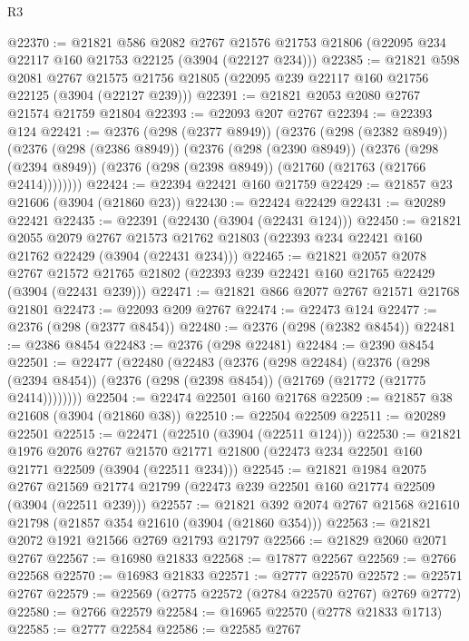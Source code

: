 \begin{lexlean}{R3}
\begin{coremodule}
@22370 := @21821
    @586
    @2082
    @2767
    @21576
    @21753
    @21806
    (@22095 @234 @22117 @160 @21753 @22125 (@3904 (@22127 @234)))
@22385 := @21821
    @598
    @2081
    @2767
    @21575
    @21756
    @21805
    (@22095 @239 @22117 @160 @21756 @22125 (@3904 (@22127 @239)))
@22391 := @21821 @2053 @2080 @2767 @21574 @21759 @21804
@22393 := @22093 @207 @2767
@22394 := @22393 @124
@22421 := @2376
    (@298 (@2377 @8949))
    (@2376
      (@298 (@2382 @8949))
      (@2376
        (@298 (@2386 @8949))
        (@2376
          (@298 (@2390 @8949))
          (@2376
            (@298 (@2394 @8949))
            (@2376 (@298 (@2398 @8949)) (@21760 (@21763 (@21766 @2414))))))))
@22424 := @22394 @22421 @160 @21759
@22429 := @21857 @23 @21606 (@3904 (@21860 @23))
@22430 := @22424 @22429
@22431 := @20289 @22421
@22435 := @22391 (@22430 (@3904 (@22431 @124)))
@22450 := @21821
    @2055
    @2079
    @2767
    @21573
    @21762
    @21803
    (@22393 @234 @22421 @160 @21762 @22429 (@3904 (@22431 @234)))
@22465 := @21821
    @2057
    @2078
    @2767
    @21572
    @21765
    @21802
    (@22393 @239 @22421 @160 @21765 @22429 (@3904 (@22431 @239)))
@22471 := @21821 @866 @2077 @2767 @21571 @21768 @21801
@22473 := @22093 @209 @2767
@22474 := @22473 @124
@22477 := @2376 (@298 (@2377 @8454))
@22480 := @2376 (@298 (@2382 @8454))
@22481 := @2386 @8454
@22483 := @2376 (@298 @22481)
@22484 := @2390 @8454
@22501 := @22477
    (@22480
      (@22483
        (@2376
          (@298 @22484)
          (@2376
            (@298 (@2394 @8454))
            (@2376 (@298 (@2398 @8454)) (@21769 (@21772 (@21775 @2414))))))))
@22504 := @22474 @22501 @160 @21768
@22509 := @21857 @38 @21608 (@3904 (@21860 @38))
@22510 := @22504 @22509
@22511 := @20289 @22501
@22515 := @22471 (@22510 (@3904 (@22511 @124)))
@22530 := @21821
    @1976
    @2076
    @2767
    @21570
    @21771
    @21800
    (@22473 @234 @22501 @160 @21771 @22509 (@3904 (@22511 @234)))
@22545 := @21821
    @1984
    @2075
    @2767
    @21569
    @21774
    @21799
    (@22473 @239 @22501 @160 @21774 @22509 (@3904 (@22511 @239)))
@22557 := @21821 @392 @2074 @2767 @21568 @21610 @21798 (@21857 @354 @21610 (@3904 (@21860 @354)))
@22563 := @21821 @2072 @1921 @21566 @2769 @21793 @21797
@22566 := @21829 @2060 @2071 @2767
@22567 := @16980 @21833
@22568 := @17877 @22567
@22569 := @2766 @22568
@22570 := @16983 @21833
@22571 := @2777 @22570
@22572 := @22571 @2767
@22579 := @22569 (@2775 @22572 (@2784 @22570 @2767) @2769 @2772)
@22580 := @2766 @22579
@22584 := @16965 @22570 (@2778 @21833 @1713)
@22585 := @2777 @22584
@22586 := @22585 @2767

\end{coremodule}
\end{lexlean}
